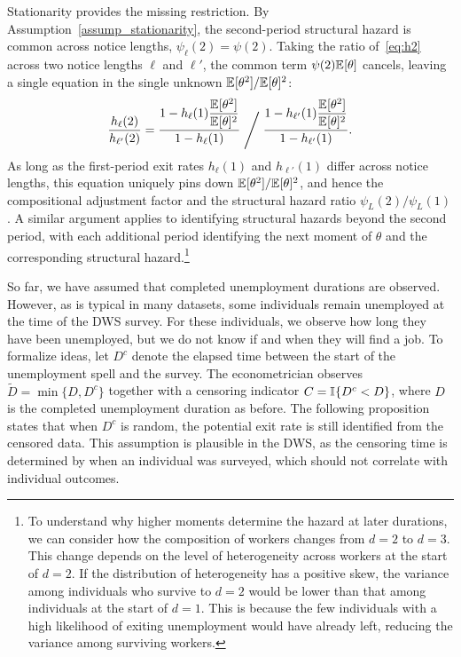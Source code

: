 \documentclass{div}
\begin{document}
Stationarity provides the missing restriction. By Assumption~\ref{assump_stationarity}, the second-period structural hazard is common across notice lengths, $\psi_\ell(2) = \psi(2)$. Taking the ratio of~\eqref{eq:h2} across two notice lengths $\ell$ and $\ell'$, the common term $\psi(2)\E[\theta]$ cancels, leaving a single equation in the single unknown $\E[\theta^2]/\E[\theta]^2$:
\[
\frac{h_\ell(2)}{h_{\ell'}(2)}
= \frac{1 - h_\ell(1)\dfrac{\E[\theta^2]}{\E[\theta]^2}}{1 - h_\ell(1)}
\;\Bigg/\;
\frac{1 - h_{\ell'}(1)\dfrac{\E[\theta^2]}{\E[\theta]^2}}{1 - h_{\ell'}(1)}.
\]
As long as the first-period exit rates $h_\ell(1)$ and $h_{\ell'}(1)$ differ across notice lengths, this equation uniquely pins down $\E[\theta^2]/\E[\theta]^2$, and hence the compositional adjustment factor and the structural hazard ratio $\psi_L(2)/\psi_L(1)$. A similar argument applies to identifying structural hazards beyond the second period, with each additional period identifying the next moment of $\theta$ and the corresponding structural hazard.\footnote{To understand why higher moments determine the hazard at later durations, we can consider how the composition of workers changes from $d=2$ to $d=3$. This change depends on the level of heterogeneity across workers at the start of $d=2$. If the distribution of heterogeneity has a positive skew, the variance among individuals who survive to $d=2$ would be lower than that among individuals at the start of $d=1$. This is because the few individuals with a high likelihood of exiting unemployment would have already left, reducing the variance among surviving workers.}



So far, we have assumed that completed unemployment durations are observed. However, as is typical in many datasets, some individuals remain unemployed at the time of the DWS survey. For these individuals, we observe how long they have been unemployed, but we do not know if and when they will find a job. To formalize ideas, let $D^c$ denote the elapsed time between the start of the unemployment spell and the survey. The econometrician observes $\tilde{D} = \min\{D, D^c\}$ together with a censoring indicator $C = \I\{D^c < D\}$, where $D$ is the completed unemployment duration as before. The following proposition states that when $D^c$ is random, the potential exit rate is still identified from the censored data. This assumption is plausible in the DWS, as the censoring time is determined by when an individual was surveyed, which should not correlate with individual outcomes.
\end{document}
